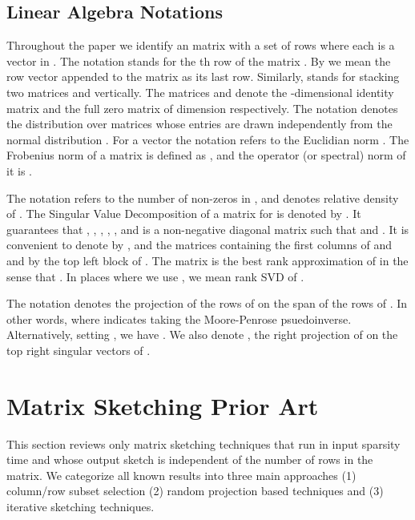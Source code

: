 \documentclass[11pt]{article}
\begin{document}
\subsection{Linear Algebra Notations}

Throughout the paper we identify an  matrix  with a set of  rows  where each  is a vector in .
The notation  stands for the th row of the matrix .  By  we mean the row vector  appended to the matrix  as its last row. 
Similarly,  stands for stacking two matrices  and  vertically.
The matrices  and  denote the -dimensional identity matrix and the full zero matrix of dimension  respectively. 
The notation  denotes the distribution over  matrices whose entries are drawn independently from the normal distribution .
For a vector  the notation  refers to the Euclidian norm .
The Frobenius norm of a matrix  is defined as , and the operator (or spectral) norm of it is 
.


The notation  refers to the number of non-zeros in , and  denotes relative density of .
The Singular Value Decomposition of a matrix  for  is denoted by .
It guarantees that , , , , ,
and  is a non-negative diagonal matrix such that  and . 
It is convenient to denote by , and  the matrices containing the first  columns of  and  and by  the top left  block of .
The matrix  is the best rank  approximation of  in the sense that . In places where we use , we mean rank  SVD of .

The notation  denotes the projection of the rows of  on the span of the rows of . In other words,  where  indicates taking the Moore-Penrose psuedoinverse.
Alternatively, setting , we have . We also denote , the right projection of  on the top  right singular vectors of . 






\section{Matrix Sketching Prior Art}
This section reviews only matrix sketching techniques that run in input sparsity time and whose output sketch is independent of the number of rows in the matrix.  We categorize all known results into three main approaches (1) column/row subset selection (2) random projection based techniques and (3) iterative sketching techniques. 
\end{document}
